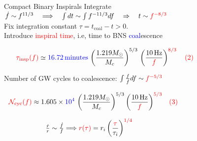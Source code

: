 \documentclass[xcolor=dvipsnames,handout,t]{beamer}
\newcommand{\red}[1]{\textcolor{red}{#1}}
\newcommand{\bl}[1]{\textcolor{blue}{#1}}
\newcommand{\f}{\frac}
\newcommand{\nn}{\nonumber}
\begin{document}
\begin{frame}{Compact Binary Inspirals}
\vspace{-3mm}
Integrate $\dot{f} \sim f^{11/3} \quad \Longrightarrow \quad \int dt \sim \int f^{-11/3}df \quad\Rightarrow\quad t \sim \red{f^{-8/3}}$
\\
\vspace{1mm}
Fix integration constant $\tau = t_\text{coal} - t >0$. \\
\vspace{2mm}
Introduce \red{inspiral time}, i.e, time to BNS \bl{coal}escence
%
\begin{small}
\begin{align}
 \red{\tau_\text{insp}(f)} %
 &\simeq \bl{16.72\,\text{minutes}} \, \left(\f{1.219 M_\odot}{M_c}\right)^{5/3}\,{\left(\f{10\,\text{Hz}}{\red{f}}\right)^{\red{8/3}}\quad \red{(2)}}\nn\hspace{2cm}
\end{align}
\end{small}
Number of GW cycles to coalescence: $\int \tfrac{f}{\dot{f}}df\sim \red{f^{-5/3}}$ %
\begin{small}
\begin{align}
 \red{\mathcal{N}_\text{cyc}(f)} %
 &\approx 1.605\times \bl{10^4}\,\left(\f{1.219 M_\odot}{M_c}\right)^{5/3}{ \left(\f{10\,\text{Hz}}{\red{f}} \right)^{\red{5/3}}}\quad \red{(3)}\nn\hspace{3.2cm}
\end{align}
\end{small}
%
%
\[ 
\tfrac{\dot{r}}{r}\sim \tfrac{\dot{f}}{f} \Longrightarrow \red{r(\tau)}=r_i \left(\f{\red{\tau}}{\tau_i}\right)^{\red{1/4}} \hspace{4cm}
\]

\end{frame}
\end{document}
